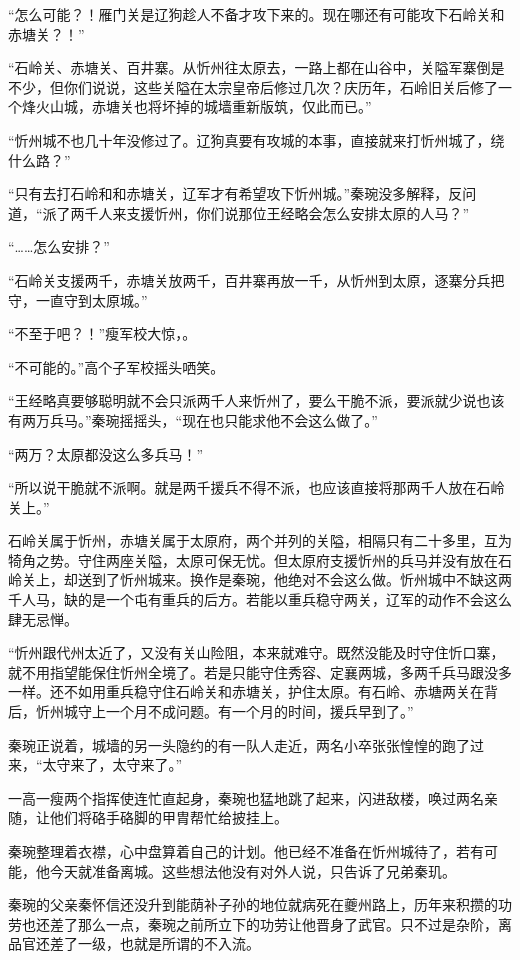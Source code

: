 “怎么可能？！雁门关是辽狗趁人不备才攻下来的。现在哪还有可能攻下石岭关和赤塘关？！”

“石岭关、赤塘关、百井寨。从忻州往太原去，一路上都在山谷中，关隘军寨倒是不少，但你们说说，这些关隘在太宗皇帝后修过几次？庆历年，石岭旧关后修了一个烽火山城，赤塘关也将坏掉的城墙重新版筑，仅此而已。”

“忻州城不也几十年没修过了。辽狗真要有攻城的本事，直接就来打忻州城了，绕什么路？”

“只有去打石岭和和赤塘关，辽军才有希望攻下忻州城。”秦琬没多解释，反问道，“派了两千人来支援忻州，你们说那位王经略会怎么安排太原的人马？”

“……怎么安排？”

“石岭关支援两千，赤塘关放两千，百井寨再放一千，从忻州到太原，逐寨分兵把守，一直守到太原城。”

“不至于吧？！”瘦军校大惊，。

“不可能的。”高个子军校摇头哂笑。

“王经略真要够聪明就不会只派两千人来忻州了，要么干脆不派，要派就少说也该有两万兵马。”秦琬摇摇头，“现在也只能求他不会这么做了。”

“两万？太原都没这么多兵马！”

“所以说干脆就不派啊。就是两千援兵不得不派，也应该直接将那两千人放在石岭关上。”

石岭关属于忻州，赤塘关属于太原府，两个并列的关隘，相隔只有二十多里，互为犄角之势。守住两座关隘，太原可保无忧。但太原府支援忻州的兵马并没有放在石岭关上，却送到了忻州城来。换作是秦琬，他绝对不会这么做。忻州城中不缺这两千人马，缺的是一个屯有重兵的后方。若能以重兵稳守两关，辽军的动作不会这么肆无忌惮。

“忻州跟代州太近了，又没有关山险阻，本来就难守。既然没能及时守住忻口寨，就不用指望能保住忻州全境了。若是只能守住秀容、定襄两城，多两千兵马跟没多一样。还不如用重兵稳守住石岭关和赤塘关，护住太原。有石岭、赤塘两关在背后，忻州城守上一个月不成问题。有一个月的时间，援兵早到了。”

秦琬正说着，城墙的另一头隐约的有一队人走近，两名小卒张张惶惶的跑了过来，“太守来了，太守来了。”

一高一瘦两个指挥使连忙直起身，秦琬也猛地跳了起来，闪进敌楼，唤过两名亲随，让他们将硌手硌脚的甲胄帮忙给披挂上。

秦琬整理着衣襟，心中盘算着自己的计划。他已经不准备在忻州城待了，若有可能，他今天就准备离城。这些想法他没有对外人说，只告诉了兄弟秦玑。

秦琬的父亲秦怀信还没升到能荫补子孙的地位就病死在夔州路上，历年来积攒的功劳也还差了那么一点，秦琬之前所立下的功劳让他晋身了武官。只不过是杂阶，离品官还差了一级，也就是所谓的不入流。

